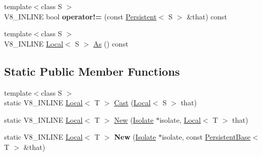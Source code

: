 \begin{DoxyCompactItemize}
\item 
\mbox{\label{classv8_1_1Local_a8c75d7c45f0d922f3dd842f96fb5c5cf}} 
{\footnotesize template$<$class S $>$ }\\V8\+\_\+\+I\+N\+L\+I\+NE bool {\bfseries operator!=} (const \mbox{\hyperlink{classv8_1_1Persistent}{Persistent}}$<$ S $>$ \&that) const
\item 
{\footnotesize template$<$class S $>$ }\\V8\+\_\+\+I\+N\+L\+I\+NE \mbox{\hyperlink{classv8_1_1Local}{Local}}$<$ S $>$ \mbox{\hyperlink{classv8_1_1Local_afa242d21780a729341644a615c4e6ea1}{As}} () const
\end{DoxyCompactItemize}
\subsection*{Static Public Member Functions}
\begin{DoxyCompactItemize}
\item 
{\footnotesize template$<$class S $>$ }\\static V8\+\_\+\+I\+N\+L\+I\+NE \mbox{\hyperlink{classv8_1_1Local}{Local}}$<$ T $>$ \mbox{\hyperlink{classv8_1_1Local_a95c8aa28ad098dd160ddd8cb60377bd6}{Cast}} (\mbox{\hyperlink{classv8_1_1Local}{Local}}$<$ S $>$ that)
\item 
static V8\+\_\+\+I\+N\+L\+I\+NE \mbox{\hyperlink{classv8_1_1Local}{Local}}$<$ T $>$ \mbox{\hyperlink{classv8_1_1Local_a1b3c386fb10d9e8f67aecec9174de1fa}{New}} (\mbox{\hyperlink{classv8_1_1Isolate}{Isolate}} $\ast$isolate, \mbox{\hyperlink{classv8_1_1Local}{Local}}$<$ T $>$ that)
\item 
\mbox{\label{classv8_1_1Local_a9ffe326224dc9b8a0b47d61b1f877741}} 
static V8\+\_\+\+I\+N\+L\+I\+NE \mbox{\hyperlink{classv8_1_1Local}{Local}}$<$ T $>$ {\bfseries New} (\mbox{\hyperlink{classv8_1_1Isolate}{Isolate}} $\ast$isolate, const \mbox{\hyperlink{classv8_1_1PersistentBase}{Persistent\+Base}}$<$ T $>$ \&that)
\end{DoxyCompactItemize}
